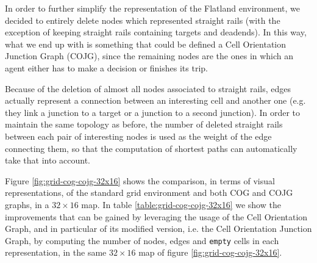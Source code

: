 \documentclass[a4paper,10pt]{report}
\begin{document}
In order to further simplify the representation of the Flatland environment, we decided to entirely delete nodes which represented straight rails (with the exception of keeping straight rails containing targets and deadends). In this way, what we end up with is something that could be defined a Cell Orientation Junction Graph (COJG), since the remaining nodes are the ones in which an agent either has to make a decision or finishes its trip.

Because of the deletion of almost all nodes associated to straight rails, edges actually represent a connection between an interesting cell and another one (e.g. they link a junction to a target or a junction to a second junction). In order to maintain the same topology as before, the number of deleted straight rails between each pair of interesting nodes is used as the weight of the edge connecting them, so that the computation of shortest paths can automatically take that into account.

Figure \ref{fig:grid-cog-cojg-32x16} shows the comparison, in terms of visual representations, of the standard grid environment and both COG and COJG graphs, in a $32\times 16$ map. In table \ref{table:grid-cog-cojg-32x16} we show the improvements that can be gained by leveraging the usage of the Cell Orientation Graph, and in particular of its modified version, i.e. the Cell Orientation Junction Graph, by computing the number of nodes, edges and \texttt{empty} cells in each representation, in the same $32\times 16$ map of figure \ref{fig:grid-cog-cojg-32x16}.
\end{document}
